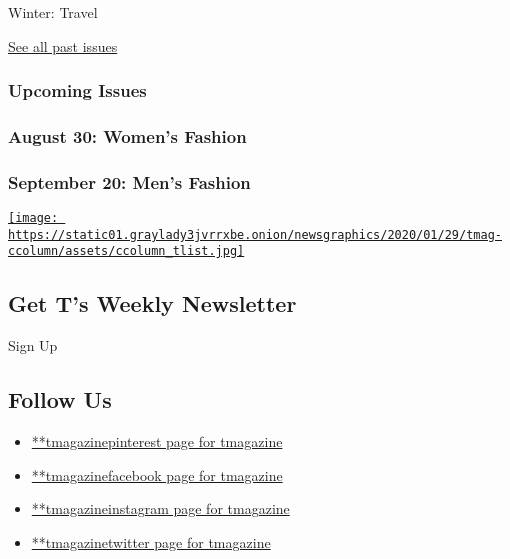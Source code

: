 Winter: Travel

\href{https://www.nytimes3xbfgragh.onion/interactive/2020/t-magazine/past-issues.html}{See
all past issues}

\hypertarget{upcoming-issues}{%
\subsubsection{Upcoming Issues}\label{upcoming-issues}}

\hypertarget{august-30-womens-fashion}{%
\subsubsection{August 30: Women's
Fashion}\label{august-30-womens-fashion}}

\hypertarget{september-20-mens-fashion}{%
\subsubsection{September 20: Men's
Fashion}\label{september-20-mens-fashion}}

\href{https://www.nytimes3xbfgragh.onion/newsletters/t-list}{\texttt{[image: https://static01.graylady3jvrrxbe.onion/newsgraphics/2020/01/29/tmag-ccolumn/assets/ccolumn\_tlist.jpg]}}

\hypertarget{get-ts-weekly-newsletter}{%
\subsection{Get T's Weekly Newsletter}\label{get-ts-weekly-newsletter}}

Sign Up

\hypertarget{follow-us}{%
\subsection{Follow Us}\label{follow-us}}

\begin{itemize}
\tightlist
\item
  \href{https://pinterest.com/tmagazine}{**tmagazinepinterest page for
  tmagazine}
\item
  \href{https://www.facebookcorewwwi.onion/tmagazine}{**tmagazinefacebook
  page for tmagazine}
\item
  \href{https://instagram.com/tmagazine}{**tmagazineinstagram page for
  tmagazine}
\item
  \href{https://twitter.com/tmagazine}{**tmagazinetwitter page for
  tmagazine}
\end{itemize}

